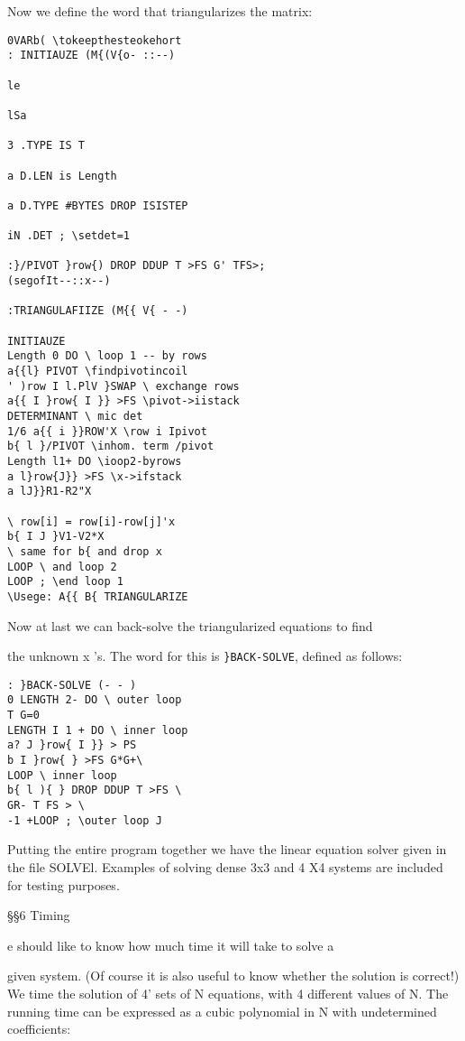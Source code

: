 Now we define the word that triangularizes the matrix:
\begin{verbatim}
0VARb( \tokeepthesteokehort
: INITIAUZE (M{(V{o- ::--)

le

lSa

3 .TYPE IS T

a D.LEN is Length

a D.TYPE #BYTES DROP ISISTEP

iN .DET ; \setdet=1

:}/PIVOT }row{) DROP DDUP T >FS G' TFS>;
(segofIt--::x--)

:TRIANGULAFIIZE (M{{ V{ - -)

INITIAUZE
Length 0 DO \ loop 1 -- by rows
a{{l} PIVOT \findpivotincoil
' )row I l.PlV }SWAP \ exchange rows
a{{ I }row{ I }} >FS \pivot->iistack
DETERMINANT \ mic det
1/6 a{{ i }}ROW'X \row i Ipivot
b{ l }/PIVOT \inhom. term /pivot
Length l1+ DO \ioop2-byrows
a l}row{J}} >FS \x->ifstack
a lJ}}R1-R2"X

\ row[i] = row[i]-row[j]'x
b{ I J }V1-V2*X
\ same for b{ and drop x
LOOP \ and loop 2
LOOP ; \end loop 1
\Usege: A{{ B{ TRIANGULARIZE
\end{verbatim}

Now at last we can back-solve the triangularized equations to find

the unknown x 's. The word for this is \verb|}BACK-SOLVE|, defined
as follows:


\begin{verbatim}
: }BACK-SOLVE (- - )
0 LENGTH 2- DO \ outer loop
T G=0
LENGTH I 1 + DO \ inner loop
a? J }row{ I }} > PS
b I }row{ } >FS G*G+\
LOOP \ inner loop
b{ l ){ } DROP DDUP T >FS \
GR- T FS > \
-1 +LOOP ; \outer loop J
\end{verbatim} 

Putting the entire program together we have the linear equation
solver given in the file SOLVEl. Examples of solving dense 3x3
and 4 X4 systems are included for testing purposes.

\S\S6 Timing

e should like to know how much time it will take to solve a

given system. (Of course it is also useful to know whether the
solution is correct!) We time the solution of 4' sets of N equations,
with 4 different values of N. The running time can be expressed
as a cubic polynomial in N with undetermined coefficients:

